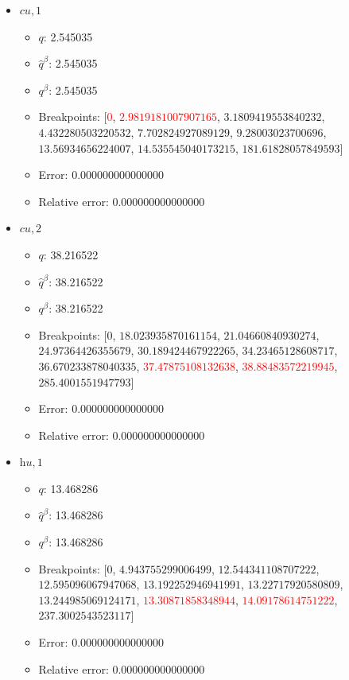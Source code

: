 \documentclass{article}%
\begin{document}
\begin{itemize}
\begin{itemize}
	\end{itemize}%
	\item $\textit{cu},1$%
	\begin{itemize}%
		\item $q$: 2.545035%
		\item $\hat{q}^\beta$: 2.545035%
		\item $q^\beta$: 2.545035%
		\item Breakpoints: $[$\textcolor{red}{$0$}, \textcolor{red}{$2.9819181007907165$}, $3.1809419553840232$, $4.432280503220532$, $7.702824927089129$, $9.28003023700696$, $13.56934656224007$, $14.535545040173215$, $181.61828057849593$$]$%
		\item Error: 0.000000000000000%
		\item Relative error: 0.000000000000000%
	\end{itemize}%
	\item $\textit{cu},2$%
	\begin{itemize}%
		\item $q$: 38.216522%
		\item $\hat{q}^\beta$: 38.216522%
		\item $q^\beta$: 38.216522%
		\item Breakpoints: $[$$0$, $18.023935870161154$, $21.04660840930274$, $24.97364426355679$, $30.189424467922265$, $34.23465128608717$, $36.670233878040335$, \textcolor{red}{$37.47875108132638$}, \textcolor{red}{$38.88483572219945$}, $285.4001551947793$$]$%
		\item Error: 0.000000000000000%
		\item Relative error: 0.000000000000000%
	\end{itemize}%
	\item $\textit{hu},1$%
	\begin{itemize}%
		\item $q$: 13.468286%
		\item $\hat{q}^\beta$: 13.468286%
		\item $q^\beta$: 13.468286%
		\item Breakpoints: $[$$0$, $4.943755299006499$, $12.544341108707222$, $12.595096067947068$, $13.192252946941991$, $13.22717920580809$, $13.244985069124171$, \textcolor{red}{$13.30871858348944$}, \textcolor{red}{$14.09178614751222$}, $237.3002543523117$$]$%
		\item Error: 0.000000000000000%
		\item Relative error: 0.000000000000000%
	\end{itemize}%
\end{itemize}%
\end{document}
